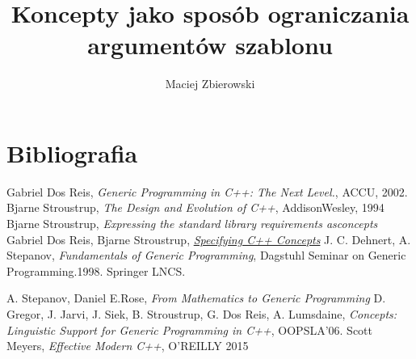 \documentclass[11pt, a4paper]{article}
\author{Maciej Zbierowski}
\title{Koncepty jako sposób ograniczania argumentów szablonu}
\begin{document}
	\maketitle
	\newpage
	\tableofcontents
	\newpage

	
	
	
	
	\newpage
	
	
	
	\newpage
	
	
	
	\newpage
	
	
	
	\newpage
	

	
	
	
	
	\newpage
	
	\section{Bibliografia}
	\begin{thebibliography}{6}
	
	 Gabriel Dos Reis, \emph{Generic Programming in C++: The Next Level.}, ACCU, 2002.
	 Bjarne Stroustrup, \emph{The Design and Evolution of C++}, AddisonWesley, 1994
	  Bjarne Stroustrup, \emph{Expressing the standard library requirements asconcepts}	
	 Gabriel Dos Reis, Bjarne Stroustrup, \href{http://www.stroustrup.com/popl06.pdf}{\emph{Specifying C++ Concepts}}
	 J. C. Dehnert, A. Stepanov, \emph{Fundamentals of Generic Programming}, Dagstuhl Seminar on Generic Programming.1998. Springer LNCS.

	 A. Stepanov, Daniel E.Rose, \emph{From Mathematics to Generic Programming}
	 D. Gregor, J. Jarvi, J. Siek, B. Stroustrup, G. Dos Reis, A. Lumsdaine, \emph{Concepts: Linguistic Support for Generic Programming in C++}, OOPSLA’06.
	 Scott Meyers, \emph{Effective Modern C++}, O'REILLY 2015
	\end{thebibliography}
\end{document}
